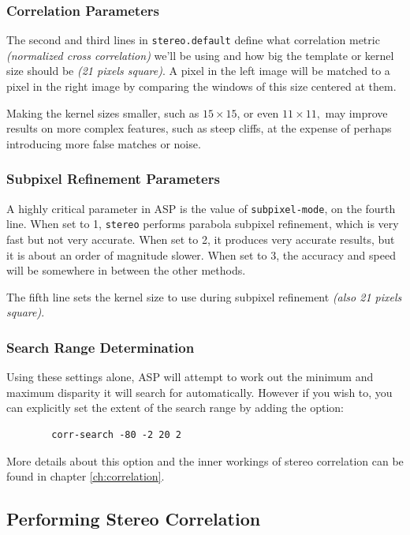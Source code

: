 \subsubsection*{Correlation Parameters}

The second and third lines in \texttt{stereo.default} define what
correlation metric \textit{(normalized cross correlation)} we'll be
using and how big the template or kernel size should be \textit{(21
pixels square)}. A pixel in the left image will be matched to a pixel in
the right image by comparing the windows of this size centered at them.

Making the kernel sizes smaller, such as $15 \times 15$, or even $11
\times 11,$ may improve results on more complex features, such as steep
cliffs, at the expense of perhaps introducing more false matches or
noise.

\subsubsection*{Subpixel Refinement Parameters}

A highly critical parameter in \ac{ASP} is the value of
\texttt{subpixel-mode}, on the fourth line. When set to 1,
\texttt{stereo} performs parabola subpixel refinement, which is very
fast but not very accurate. When set to 2, it produces very accurate
results, but it is about an order of magnitude slower. When set to 3,
the accuracy and speed will be somewhere in between the other methods.

The fifth line sets the kernel size to use during subpixel refinement
\textit{(also 21 pixels square)}.

\subsubsection*{Search Range Determination}

Using these settings alone, \ac{ASP} will attempt to work out the
minimum and maximum disparity it will search for automatically. However if you
wish to, you can explicitly set the extent of the search range by
adding the option:
\begin{verbatim}
        corr-search -80 -2 20 2
\end{verbatim}

More details about this option and the inner workings of stereo correlation
can be found in chapter \ref{ch:correlation}.

\subsection{Performing Stereo Correlation}\label{perform-stereo}


